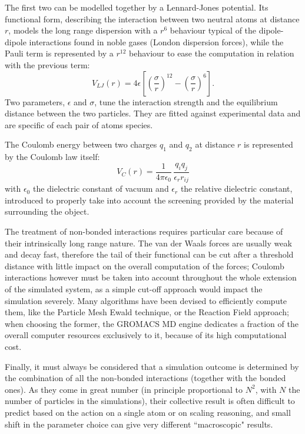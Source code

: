 The first two can be modelled together by a Lennard-Jones potential. Its functional form, describing the interaction between two neutral atoms at distance $r$, models the long range dispersion with a $r^6$ behaviour typical of the dipole-dipole interactions found in noble gases (London dispersion forces), while the Pauli term is represented by a $r^{12}$ behaviour to ease the computation in relation with the previous term:
\begin{equation}
V_{LJ}(r) = 4 \epsilon \left[ \left( \frac{\sigma}{r} \right)^{12} - \left( \frac{\sigma}{r} \right)^6 \right].
\end{equation}
Two parameters, $\epsilon$ and $\sigma$, tune the interaction strength and the equilibrium distance between the two particles. They are fitted against experimental data and are specific of each pair of atoms species.

The Coulomb energy between two charges $q_1$ and $q_2$ at distance $r$ is represented by the Coulomb law itself:
\begin{equation}
V_C(r) = \frac{1}{4 \pi \epsilon_0} \, \frac{q_i q_j}{\epsilon_r r_{ij}}
\end{equation}
with $\epsilon_0$ the dielectric constant of vacuum and $\epsilon_r$ the relative dielectric constant, introduced to properly take into account the screening provided by the material surrounding the object.

The treatment of non-bonded interactions requires particular care because of their intrinsically long range nature. The van der Waals forces are usually weak and decay fast, therefore the tail of their functional can be cut after a threshold distance with little impact on the overall computation of the forces; Coulomb interactions however must be taken into account throughout the whole extension of the simulated system, as a simple cut-off approach would impact the simulation severely. Many algorithms have been devised to efficiently compute them, like the Particle Mesh Ewald \cite{Essmann1995} technique, or the Reaction Field \cite{Tironi1995} approach; when choosing the former, the GROMACS MD engine dedicates a fraction of the overall computer resources exclusively to it, because of its high computational cost.

Finally, it must always be considered that a simulation outcome is determined by the combination of all the non-bonded interactions (together with the bonded ones). As they come in great number (in principle proportional to $N^2$, with $N$ the number of particles in the simulations), their collective result is often difficult to predict based on the action on a single atom or on scaling reasoning, and small shift in the parameter choice can give very different ``macroscopic" results.


